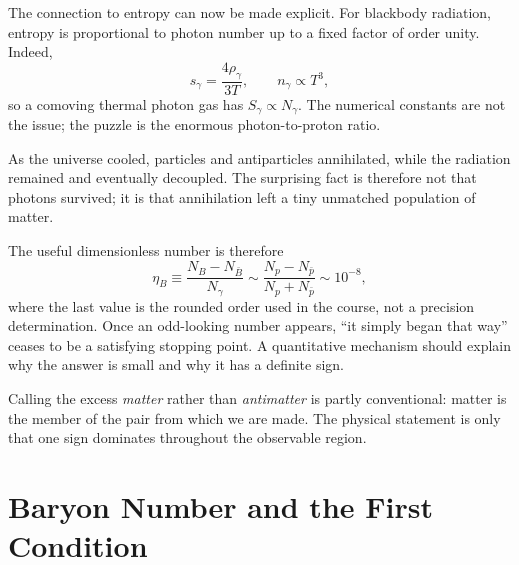 The connection to entropy can now be made explicit. For blackbody radiation, entropy is proportional to photon number up to a fixed factor of order unity. Indeed,
\begin{equation}
s_\gamma=\frac{4\rho_\gamma}{3T},
\qquad
n_\gamma\propto T^3,
\end{equation}
so a comoving thermal photon gas has \(S_\gamma\propto N_\gamma\). The numerical constants are not the issue; the puzzle is the enormous photon-to-proton ratio.

\begin{classroomqa}
\end{classroomqa}

As the universe cooled, particles and antiparticles annihilated, while the radiation remained and eventually decoupled. The surprising fact is therefore not that photons survived; it is that annihilation left a tiny unmatched population of matter.

The useful dimensionless number is therefore
\begin{equation}
\eta_B
\equiv
\frac{N_B-N_{\bar B}}{N_\gamma}
\sim
\frac{N_p-N_{\bar p}}{N_p+N_{\bar p}}
\sim 10^{-8},
\label{eq:c08-baryon-asymmetry}
\end{equation}
where the last value is the rounded order used in the course, not a precision determination. Once an odd-looking number appears, ``it simply began that way'' ceases to be a satisfying stopping point. A quantitative mechanism should explain why the answer is small and why it has a definite sign.

Calling the excess \emph{matter} rather than \emph{antimatter} is partly conventional: matter is the member of the pair from which we are made. The physical statement is only that one sign dominates throughout the observable region.

\section{Baryon Number and the First Condition}

